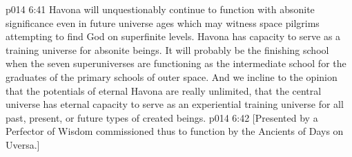 \vs p014 6:41 \pc Havona will unquestionably continue to function with absonite significance even in future universe ages which may witness space pilgrims attempting to find God on superfinite levels. Havona has capacity to serve as a training universe for absonite beings. It will probably be the finishing school when the seven superuniverses are functioning as the intermediate school for the graduates of the primary schools of outer space. And we incline to the opinion that the potentials of eternal Havona are really unlimited, that the central universe has eternal capacity to serve as an experiential training universe for all past, present, or future types of created beings.
\vsetoff
\vs p014 6:42 [Presented by a Perfector of Wisdom commissioned thus to function by the Ancients of Days on Uversa.]
